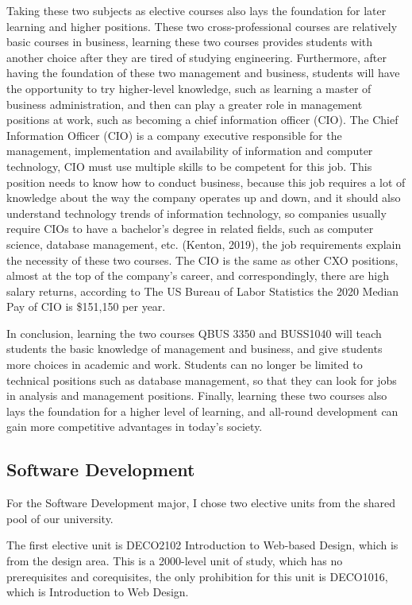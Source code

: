 \documentclass[12pt]{article}
\begin{document}
Taking these two subjects as elective courses also lays the foundation for later learning and higher positions. These two cross-professional courses are relatively basic courses in business, learning these two courses provides students with another choice after they are tired of studying engineering. Furthermore, after having the foundation of these two management and business, students will have the opportunity to try higher-level knowledge, such as learning a master of business administration, and then can play a greater role in management positions at work, such as becoming a chief information officer (CIO). The Chief Information Officer (CIO) is a company executive responsible for the management, implementation and availability of information and computer technology, CIO must use multiple skills to be competent for this job. This position needs to know how to conduct business, because this job requires a lot of knowledge about the way the company operates up and down, and it should also understand technology trends of information technology, so companies usually require CIOs to have a bachelor's degree in related fields, such as computer science, database management, etc. (Kenton, 2019), the job requirements explain the necessity of these two courses. The CIO is the same as other CXO positions, almost at the top of the company's career, and correspondingly, there are high salary returns, according to The US Bureau of Labor Statistics the 2020 Median Pay of CIO is \$151,150 per year.

In conclusion, learning the two courses QBUS 3350 and BUSS1040 will teach students the basic knowledge of management and business, and give students more choices in academic and work. Students can no longer be limited to technical positions such as database management, so that they can look for jobs in analysis and management positions. Finally, learning these two courses also lays the foundation for a higher level of learning, and all-round development can gain more competitive advantages in today's society.

\newpage
\subsection{Software Development}
For the Software Development major, I chose two elective units from the shared pool of our university.

The first elective unit is DECO2102 Introduction to Web-based Design, which is from the design area. This is a 2000-level unit of study, which has no prerequisites and corequisites, the only prohibition for this unit is DECO1016, which is Introduction to Web Design.
\end{document}

